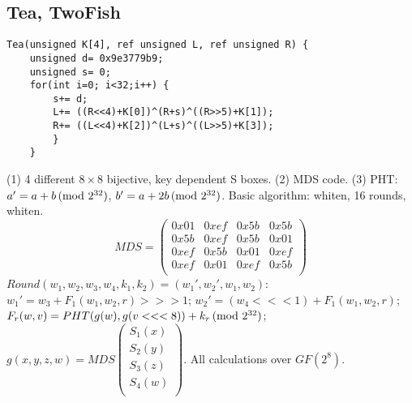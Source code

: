 \subsection{Tea, TwoFish}
\begin{verbatim}
Tea(unsigned K[4], ref unsigned L, ref unsigned R) {
    unsigned d= 0x9e3779b9;
    unsigned s= 0;
    for(int i=0; i<32;i++) {
        s+= d;
        L+= ((R<<4)+K[0])^(R+s)^((R>>5)+K[1]);
        R+= ((L<<4)+K[2])^(L+s)^((L>>5)+K[3]);
        }
    }
\end{verbatim}
(1) 4 different $8 \times 8$ bijective, key dependent S boxes.
(2) MDS code.
(3) PHT: $a'= a+b \thinspace \textnormal{(mod } 2^{32} \textnormal{)}$,
$b'= a+2b \thinspace \textnormal{(mod } 2^{32} \textnormal{)}$.
Basic algorithm: whiten, 16 rounds, whiten. \\
$$
MDS= 
\left(
\begin{array}{cccc}
0x01 & 0xef & 0x5b & 0x5b\\
0x5b & 0xef & 0x5b & 0x01\\
0xef & 0x5b & 0x01 & 0xef\\
0xef & 0x01 & 0xef & 0x5b\\
\end{array}
\right)
$$
$Round(w_1 , w_2 , w_3 , w_4 , k_1 , k_2 )= (w_1 ', w_2 ', w_1 , w_2 )$:
$w_1 '= w_3 + F_1 (w_1 , w_2 , r) >>> 1$;
$w_2 '= (w_4 <<< 1)+ F_1 (w_1 , w_2 , r)$;
$F_r (w, v) = PHT(g(w), g(v<<<8)) + k_r \thinspace \textnormal{(mod } 2^{32} \textnormal{)}$;
$g(x, y, z,w) = MDS 
\left(
\begin{array}{c}
S_1 (x) \\
S_2 (y) \\
S_3 (z) \\
S_4 (w) \\
\end{array}
\right)$.  All calculations over $GF(2^8 )$.
